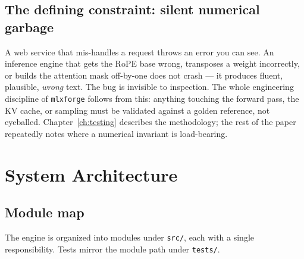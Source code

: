 \documentclass[11pt,a4paper]{report}
\newcommand{\code}[1]{\texttt{#1}}
\begin{document}
\section{The defining constraint: silent numerical garbage}
A web service that mis-handles a request throws an error you can see. An inference
engine that gets the RoPE base wrong, transposes a weight incorrectly, or builds
the attention mask off-by-one does not crash --- it produces fluent, plausible,
\emph{wrong} text. The bug is invisible to inspection. The whole engineering
discipline of \code{mlxforge} follows from this: anything touching the forward
pass, the KV cache, or sampling must be validated against a golden reference, not
eyeballed. Chapter~\ref{ch:testing} describes the methodology; the rest of the
paper repeatedly notes where a numerical invariant is load-bearing.

\chapter{System Architecture}
\label{ch:arch}

\section{Module map}
The engine is organized into modules under \code{src/}, each with a single
responsibility. Tests mirror the module path under \code{tests/}.
\end{document}
